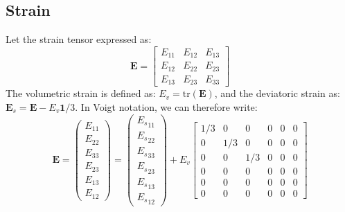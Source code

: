 \documentclass[letterpaper,12pt,oneside]{report}
\begin{document}
\subsection{Strain}
Let the strain tensor expressed as:
\begin{equation}
\mathbf{E} = 
\left[\begin{array}{ccc}
E_{11} & E_{12} & E_{13} \\
E_{12} & E_{22} & E_{23} \\
E_{13} & E_{23} & E_{33}
\end{array}\right]
\end{equation}
The volumetric strain is defined as: $E_v = \mathrm{tr}(\mathbf{E})$, and the deviatoric strain as: $\mathbf{E}_s = \mathbf{E} - E_v \mathbf{1} /3$. In Voigt notation, we can therefore write:
\begin{equation}
\mathbf{E} = 
\left(\begin{array}{c}
E_{11} \\ E_{22} \\ E_{33} \\ E_{23} \\ E_{13} \\ E_{12}
\end{array}\right)
 = 
\left(\begin{array}{c}
{E_s}_{11} \\ {E_s}_{22} \\ {E_s}_{33} \\ {E_s}_{23} \\ {E_s}_{13} \\ {E_s}_{12}
\end{array}\right)
+ E_v
\left[\begin{array}{cccccc}
1/3 & 0 & 0 & 0 & 0 & 0 \\
0 & 1/3 & 0 & 0 & 0 & 0 \\
0 & 0 & 1/3 & 0 & 0 & 0 \\
0 & 0 & 0 & 0 & 0 & 0 \\
0 & 0 & 0 & 0 & 0 & 0 \\
0 & 0 & 0 & 0 & 0 & 0
\end{array}\right]
\end{equation}
\end{document}
